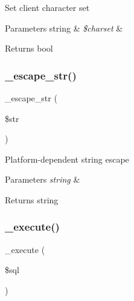 Set client character set


\begin{DoxyParams}[1]{Parameters}
string & {\em \$charset} & \\
\hline
\end{DoxyParams}
\begin{DoxyReturn}{Returns}
bool 
\end{DoxyReturn}
\mbox{\label{class_c_i___d_b__mysqli__driver_af8ef0237bfcdb19215b63fff769e7a55}} 
\subsubsection{\texorpdfstring{\+\_\+escape\+\_\+str()}{\_escape\_str()}}
{\footnotesize\ttfamily \+\_\+escape\+\_\+str (\begin{DoxyParamCaption}\item[{}]{\$str }\end{DoxyParamCaption})\hspace{0.3cm}{\ttfamily [protected]}}

Platform-\/dependent string escape


\begin{DoxyParams}{Parameters}
{\em string} & \\
\hline
\end{DoxyParams}
\begin{DoxyReturn}{Returns}
string 
\end{DoxyReturn}
\mbox{\label{class_c_i___d_b__mysqli__driver_a114ab675d89bf8324a41785fb475e86d}} 
\subsubsection{\texorpdfstring{\+\_\+execute()}{\_execute()}}
{\footnotesize\ttfamily \+\_\+execute (\begin{DoxyParamCaption}\item[{}]{\$sql }\end{DoxyParamCaption})\hspace{0.3cm}{\ttfamily [protected]}}

